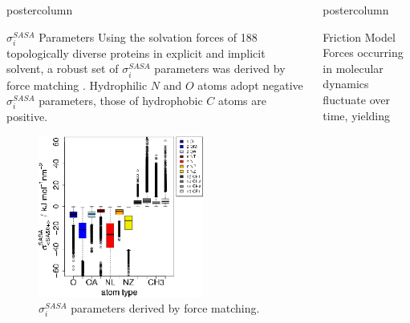 \documentclass{beamer}
\newcommand{\sig}{$\sigma_i^{SASA}$}
\newlength{\columnheight}
\begin{document}
\begin{frame}
\begin{columns}
\begin{column}{.45\textwidth}
\begin{beamercolorbox}[center]{postercolumn}
\begin{minipage}{.98\textwidth}
{\begin{myblock}{\sig{} Parameters}
Using the solvation forces of 188 topologically diverse proteins in explicit
and implicit solvent, a robust set of \sig{} parameters was derived by
force matching \cite{Fraternali:1996p939,Kleinjung_2012a}.
Hydrophilic $N$ and $O$ atoms adopt negative \sig{} parameters,
those of hydrophobic $C$ atoms are positive.
\vspace{2cm}
\begin{figure}
\begin{minipage}{1.0\textwidth}
\centering\includegraphics[width=0.7\textwidth]{./sigma.all.atomtype.box.sided.eps}
\caption{\sig{} parameters derived by force matching.}
\label{fig:projection}
\end{minipage}
\end{figure}
\end{myblock}\vfill
}\end{minipage}
\end{beamercolorbox}
\end{column}
\begin{column}{.45\textwidth}
\begin{beamercolorbox}[center]{postercolumn}
\begin{minipage}{.98\textwidth}  %
\parbox[t][\columnheight]{\textwidth}{ %
\begin{myblock}{Friction Model}
Forces occurring in molecular dynamics fluctuate over time, yielding

\end{myblock}}
\end{minipage}
\end{beamercolorbox}
\end{column}
\end{columns}
\end{frame}
\end{document}
